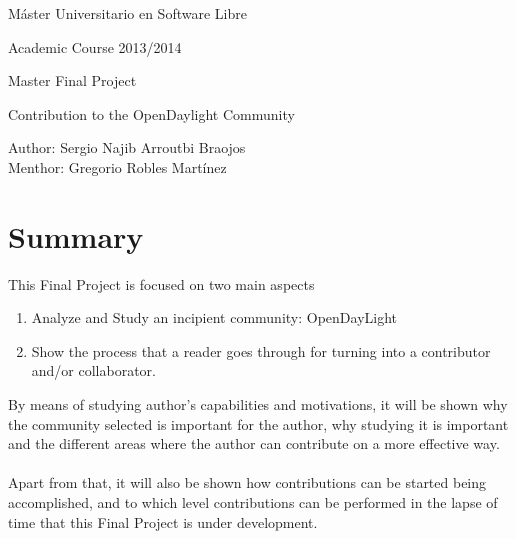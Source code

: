 \documentclass[a4paper, 12pt]{book}
\begin{document}
\begin{titlepage}
\begin{center}
\vspace{3cm}

\Large
Máster Universitario en Software Libre

\vspace{0.4cm}

\large
Academic Course 2013/2014

\vspace{0.8cm}

Master Final Project

\vspace{2.5cm}

\LARGE
Contribution to the OpenDaylight Community

\vspace{4cm}

\large
Author: Sergio Najib Arroutbi Braojos \\
Menthor: Gregorio Robles Martínez
\end{center}
\end{titlepage}

\tableofcontents

\listoffigures

\listoftables


\chapter{Summary}
\label{chap:summary}
This Final Project is focused on two main aspects
\begin{enumerate}
\item{Analyze and Study an incipient community: OpenDayLight}
\item{Show the process that a reader goes through for turning into a contributor and/or collaborator.}
\end{enumerate}
By means of studying author's capabilities and motivations, it will be shown why the community selected is important for the author, why studying it is important and the different areas where the author can contribute on a more effective way.\\
\\
Apart from that, it will also be shown how contributions can be started being accomplished, and to which level contributions can be performed in the lapse of time that this Final Project is under development.

\end{document}
